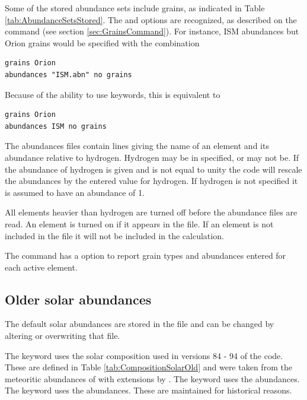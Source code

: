 Some of the stored abundance sets include grains, as indicated in Table \ref{tab:AbundanceSetsStored}.
The  and  options are recognized,
as described on the  command (see section \ref{sec:GrainsCommand}).
For instance, ISM abundances but Orion grains would be specified with the combination
\begin{verbatim}
grains Orion
abundances "ISM.abn" no grains
\end{verbatim}
Because of the ability to use keywords, this is equivalent to
\begin{verbatim}
grains Orion
abundances ISM no grains
\end{verbatim}

The abundances files contain lines giving the name of an element and its abundance relative 
to hydrogen. 
Hydrogen may be in specified, or may not be.  If the abundance of hydrogen is 
given and is not equal to unity the code will rescale the abundances by the entered value 
for hydrogen.  If hydrogen is not specified it is assumed to have an abundance
of 1.

All elements heavier than hydrogen are turned off before the abundance files are read.
An element is turned on if it appears in the file.
If an element is not included in the file it will not be included in the calculation.

The  command has a  option to report
grain types and abundances entered for each active element.

\subsection{Older solar abundances}

The default solar abundances are stored in the file 
 and can be changed
by altering or overwriting that file.

The keyword  uses the solar composition
used in versions 84 - 94 of the code.
These are defined in Table \ref{tab:CompositionSolarOld}
and were taken from the
meteoritic abundances of \citet{Grevesse1989} with extensions by
\citet{Grevesse1993}.
The keyword  uses the \citet{Cameron1982}
abundances.
The keyword  uses the \citet{Allen1973} abundances.
These are maintained for historical reasons.


